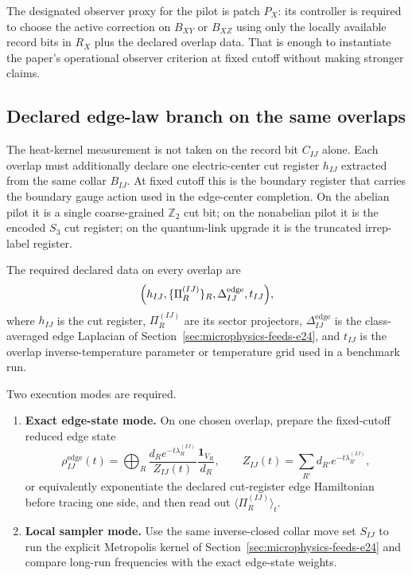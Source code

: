\documentclass[11pt]{article}
\begin{document}
The designated observer proxy for the pilot is patch $P_X$: its controller is required to choose
the active correction on $B_{XY}$ or $B_{XZ}$ using only the locally available record bits in
$R_X$ plus the declared overlap data. That is enough to instantiate the paper's
operational observer criterion at fixed cutoff without making stronger claims.

\subsection{Declared edge-law branch on the same overlaps}

The heat-kernel measurement is not taken on the record bit $C_{IJ}$ alone. Each overlap must
additionally declare one electric-center cut register $h_{IJ}$ extracted from the same collar
$B_{IJ}$. At fixed cutoff this is the boundary register that carries the boundary gauge action
used in the edge-center completion. On the abelian pilot it is a single coarse-grained
$\mathbb Z_2$ cut bit; on the nonabelian pilot it is the encoded $S_3$ cut register; on the
quantum-link upgrade it is the truncated irrep-label register.

The required declared data on every overlap are
\begin{equation}
\Bigl(
h_{IJ},
\{\Pi_R^{(IJ)}\}_R,
\Delta_{IJ}^{\mathrm{edge}},
t_{IJ}
\Bigr),
\end{equation}
where $h_{IJ}$ is the cut register, $\Pi_R^{(IJ)}$ are its sector projectors,
$\Delta_{IJ}^{\mathrm{edge}}$ is the class-averaged edge Laplacian of
Section~\ref{sec:microphysics-feeds-e24}, and $t_{IJ}$ is the overlap inverse-temperature
parameter or temperature grid used in a benchmark run.

Two execution modes are required.
\begin{enumerate}[leftmargin=2em]
\item \textbf{Exact edge-state mode.}
On one chosen overlap, prepare the fixed-cutoff reduced edge state
\begin{equation}
\rho_{IJ}^{\mathrm{edge}}(t)
=
\bigoplus_R
\frac{d_R e^{-t\lambda_R^{(IJ)}}}{Z_{IJ}(t)}
\frac{\mathbf 1_{V_R}}{d_R},
\qquad
Z_{IJ}(t)=\sum_{R'} d_{R'} e^{-t\lambda_{R'}^{(IJ)}},
\end{equation}
or equivalently exponentiate the declared cut-register edge Hamiltonian before tracing one side,
and then read out $\langle \Pi_R^{(IJ)}\rangle_t$.
\item \textbf{Local sampler mode.}
Use the same inverse-closed collar move set $S_{IJ}$ to run the explicit Metropolis kernel of
Section~\ref{sec:microphysics-feeds-e24} and compare long-run frequencies with the exact
edge-state weights.
\end{enumerate}
\end{document}
